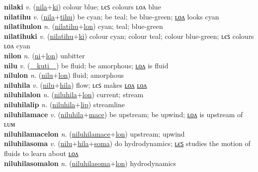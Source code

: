 \textbf{nilaki} \textit{v.} (\hyperref[nila]{nila}+\hyperref[ki]{ki})
colour blue; ʟєꜱ colours ʟᴏᴧ blue \label{nilaki} \\
\textbf{nilatihu} \textit{v.} (\hyperref[nila]{nila}+\hyperref[tihu]{tihu})
be cyan; be teal; be blue-green; \hyperref[nilatihulon]{ʟᴏᴧ} looks cyan \label{nilatihu} \\
\textbf{nilatihulon} \textit{n.} (\hyperref[nilatihu]{nilatihu}+\hyperref[lon]{lon})
cyan; teal; blue-green \label{nilatihulon} \\
\textbf{nilatihuki} \textit{v.} (\hyperref[nilatihu]{nilatihu}+\hyperref[ki]{ki})
colour cyan; colour teal; colour blue-green; ʟєꜱ colours ʟᴏᴧ cyan \label{nilatihuki} \\
\textbf{nilon} \textit{n.} (\hyperref[ni]{ni}+\hyperref[lon]{lon})
unbitter \label{nilon} \\
\textbf{nilu} \textit{v.} (\hyperref[kuti]{~~kuti~~})
be fluid; be amorphous; \hyperref[nilulon]{ʟᴏᴧ} is fluid \label{nilu} \\
\textbf{nilulon} \textit{n.} (\hyperref[nilu]{nilu}+\hyperref[lon]{lon})
fluid; amorphous \label{nilulon} \\
\textbf{niluhila} \textit{v.} (\hyperref[nilu]{nilu}+\hyperref[hila]{hila})
flow; ʟєꜱ makes \hyperref[niluhilalon]{ʟᴏᴧ} \hyperref[niluhilalon]{ʟᴏᴧ} \label{niluhila} \\
\textbf{niluhilalon} \textit{n.} (\hyperref[niluhila]{niluhila}+\hyperref[lon]{lon})
current; stream \label{niluhilalon} \\
\textbf{niluhilalip} \textit{n.} (\hyperref[niluhila]{niluhila}+\hyperref[lip]{lip})
streamline \label{niluhilalip} \\
\textbf{niluhilamace} \textit{v.} (\hyperref[niluhila]{niluhila}+\hyperref[mace]{mace})
be upstream; be upwind; \hyperref[niluhilamacelon]{ʟᴏᴧ} is upstream of ʟᴜᴍ \label{niluhilamace} \\
\textbf{niluhilamacelon} \textit{n.} (\hyperref[niluhilamace]{niluhilamace}+\hyperref[lon]{lon})
upstream; upwind \label{niluhilamacelon} \\
\textbf{niluhilasoma} \textit{v.} (\hyperref[nilu]{nilu}+\hyperref[hila]{hila}+\hyperref[soma]{soma})
do hydrodynamics; \hyperref[niluhilasomales]{ʟєꜱ} studies the motion of fluids to learn about \hyperref[niluhilasomalon]{ʟᴏᴧ} \label{niluhilasoma} \\
\textbf{niluhilasomalon} \textit{n.} (\hyperref[niluhilasoma]{niluhilasoma}+\hyperref[lon]{lon})
hydrodynamics \label{niluhilasomalon} \\
